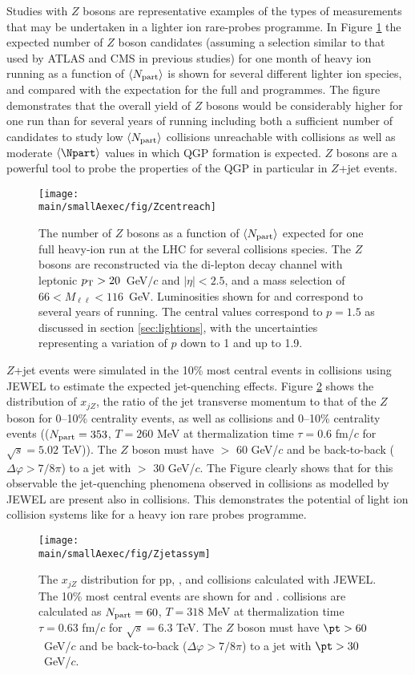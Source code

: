 Studies with $Z$ bosons are representative examples of the types of measurements that may be undertaken in a lighter ion rare-probes programme.  In Figure \ref{fig:Zreach} the expected number of $Z$ boson candidates (assuming a selection similar to that used by ATLAS and CMS in previous studies) for one month of heavy ion running  as a function of $\langle N_{\rm part}\rangle$ is shown for several different lighter ion species, and compared with the expectation for the full \PbPb and \pPb programmes.  The figure demonstrates that the overall yield of $Z$ bosons would be considerably higher for one \ArAr run than for several years of \PbPb running including both a sufficient number of candidates to study low $\langle N_{\rm part}\rangle$ collisions unreachable with \PbPb collisions as well as moderate $\langle\Npart\rangle$ values in which QGP formation is expected.  $Z$ bosons are a powerful tool to probe the properties of the QGP in particular in $Z$+jet events.  
\begin{figure}
\centering
\texttt{[image: \\main/smallAexec/fig/Zcentreach]}
\caption{
The number of $Z$ bosons as a function of $\langle N_{\rm part}\rangle$ expected for one full heavy-ion run at the LHC for several collisions species.  The $Z$ bosons are reconstructed via the di-lepton decay channel with leptonic $p\sb{\scriptstyle\mathrm{T}}>20$~GeV$/c$ and $|\eta|<2.5$, and a mass selection of $66<M_{\ell\ell}<116$~GeV.  Luminosities shown for \PbPb and \pPb correspond to several years of running.  The central values correspond to $p=1.5$ as discussed in section \ref{sec:lightions}, with the uncertainties representing a variation of $p$ down to 1 and up to 1.9.
\label{fig:Zreach}}
\end{figure}

$Z$+jet events were simulated in the 10\% most central events in \ArAr collisions using JEWEL \cite{Zapp:2009ud} to estimate the expected jet-quenching effects.  Figure \ref{fig:ArAr_xjz} shows the distribution of $x_{jZ}$, the ratio of the jet transverse momentum to that of the $Z$ boson for 0--10\% centrality \ArAr events, as well as \pp collisions and 0--10\% centrality \PbPb events (($N_{\rm part} = 353$, $T=260$ MeV at thermalization time $\tau = 0.6$ fm/$c$ for $\sqrt{s}=5.02$ TeV)).  The $Z$ boson must have \pt $>$ 60 GeV/$c$ and be back-to-back ($\Delta\varphi > 7/8\pi$) to a jet with \pt $>$ 30 GeV/$c$.  The Figure clearly shows that for this observable the jet-quenching phenomena observed in \PbPb collisions as modelled by JEWEL are present also in \ArAr collisions.  This demonstrates the potential of light ion collision systems like \ArAr for a heavy ion rare probes programme.%
\begin{figure}
\centering
\texttt{[image: \\main/smallAexec/fig/Zjetassym]}
\caption{
The $x_{jZ}$ distribution for pp, \PbPb, and \ArAr collisions calculated with JEWEL.  The 10\% most central events are shown for \PbPb and \ArAr.  \ArAr collisions are calculated as $N_{\rm part} = 60$, $T=318$ MeV at thermalization time $\tau = 0.63$ fm/$c$ for $\sqrt{s}=6.3$ TeV.  The $Z$ boson must have $\pt > 60$~GeV/$c$ and be back-to-back ($\Delta\varphi > 7/8\pi$) to a jet with $\pt > 30$~GeV/$c$.    
\label{fig:ArAr_xjz}}
\end{figure}